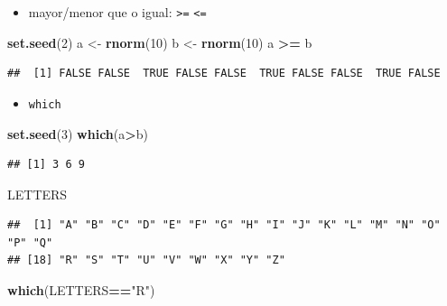 \documentclass[]{book}
\newenvironment{Shaded}{\begin{snugshade}}{\end{snugshade}}
\newcommand{\KeywordTok}[1]{\textcolor[rgb]{0.13,0.29,0.53}{\textbf{#1}}}
\newcommand{\DecValTok}[1]{\textcolor[rgb]{0.00,0.00,0.81}{#1}}
\newcommand{\StringTok}[1]{\textcolor[rgb]{0.31,0.60,0.02}{#1}}
\newcommand{\OperatorTok}[1]{\textcolor[rgb]{0.81,0.36,0.00}{\textbf{#1}}}
\newcommand{\NormalTok}[1]{#1}
\providecommand{\tightlist}{%
  \setlength{\itemsep}{0pt}\setlength{\parskip}{0pt}}
\begin{document}
\begin{itemize}
\tightlist
\item
  mayor/menor que o igual: \texttt{\textgreater{}=}
  \texttt{\textless{}=}
\end{itemize}

\begin{Shaded}
\begin{Highlighting}[]
\KeywordTok{set.seed}\NormalTok{(}\DecValTok{2}\NormalTok{)}
\NormalTok{a <-}\StringTok{ }\KeywordTok{rnorm}\NormalTok{(}\DecValTok{10}\NormalTok{)}
\NormalTok{b <-}\StringTok{ }\KeywordTok{rnorm}\NormalTok{(}\DecValTok{10}\NormalTok{)}
\NormalTok{a }\OperatorTok{>=}\StringTok{ }\NormalTok{b}
\end{Highlighting}
\end{Shaded}

\begin{verbatim}
##  [1] FALSE FALSE  TRUE FALSE FALSE  TRUE FALSE FALSE  TRUE FALSE
\end{verbatim}

\begin{itemize}
\tightlist
\item
  \texttt{which}
\end{itemize}

\begin{Shaded}
\begin{Highlighting}[]
\KeywordTok{set.seed}\NormalTok{(}\DecValTok{3}\NormalTok{)}
\KeywordTok{which}\NormalTok{(a}\OperatorTok{>}\NormalTok{b)}
\end{Highlighting}
\end{Shaded}

\begin{verbatim}
## [1] 3 6 9
\end{verbatim}

\begin{Shaded}
\begin{Highlighting}[]
\NormalTok{LETTERS}
\end{Highlighting}
\end{Shaded}

\begin{verbatim}
##  [1] "A" "B" "C" "D" "E" "F" "G" "H" "I" "J" "K" "L" "M" "N" "O" "P" "Q"
## [18] "R" "S" "T" "U" "V" "W" "X" "Y" "Z"
\end{verbatim}

\begin{Shaded}
\begin{Highlighting}[]
\KeywordTok{which}\NormalTok{(LETTERS}\OperatorTok{==}\StringTok{"R"}\NormalTok{)}
\end{Highlighting}
\end{Shaded}
\end{document}
